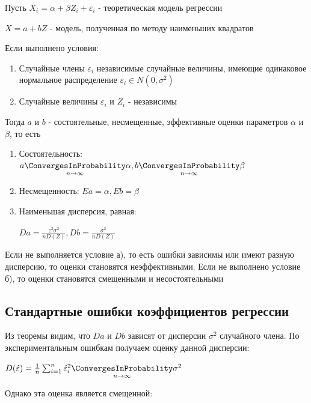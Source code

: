 \documentclass[12pt]{article}
\begin{document}
\begin{MyTheorem}
    \Ths Пусть $X_i = \alpha + \beta Z_i + \varepsilon_i$ - теоретическая модель регрессии

    $X = a + b Z$ - модель, полученная по методу наименьших квадратов

    Если выполнено условия:

    \begin{enumerate}[label=\asbuk*),ref=\asbuk*]
        \item Случайные члены $\varepsilon_i$ независимые случайные величины, имеющие одинаковое нормальное распределение $\varepsilon_i \in N(0, \sigma^2)$
        \item Случайные величины $\varepsilon_i$ и $Z_i$ - независимы
    \end{enumerate}

    Тогда $a$ и $b$ - состоятельные, несмещенные, эффективные оценки параметров $\alpha$ и $\beta$, то есть

    \begin{enumerate}
        \item Состоятельность: $a \underset{n \to \infty}{\ConvergesInProbability} \alpha, b \underset{n \to \infty}{\ConvergesInProbability} \beta$
        \item Несмещенность: $Ea = \alpha, Eb = \beta$
        \item Наименьшая дисперсия, равная:

        $D a = \frac{\overline{z^2} \sigma^2}{n D(Z)}, Db = \frac{\sigma^2}{n D(Z)}$
    \end{enumerate}
\end{MyTheorem}

\Nota Если не выполняется условие а), то есть ошибки зависимы или имеют разную дисперсию, то оценки становятся неэффективными. 
Если не выполнено условие б), то оценки становятся смещенными и несостоятельными

\subsection{Стандартные ошибки коэффициентов регрессии}

Из теоремы видим, что $Da$ и $Db$ зависят от дисперсии $\sigma^2$ случайного члена. 
По экспериментальным ошибкам получаем оценку данной дисперсии:

$D(\hat \varepsilon) = \frac{1}{n} \sum_{i = 1}^n {\hat \varepsilon_i}^2 \underset{n \to \infty}{\ConvergesInProbability} \sigma^2$

Однако эта оценка является смещенной:
\end{document}
